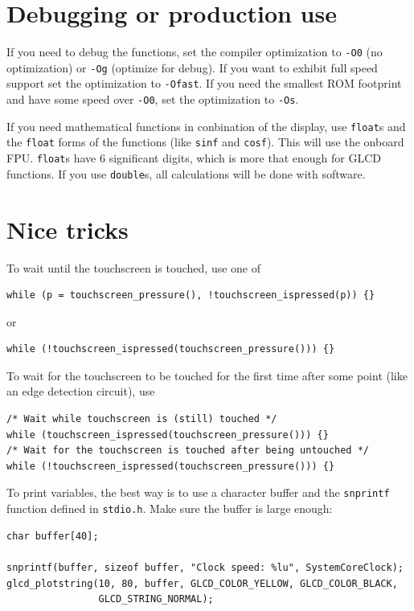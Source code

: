 \documentclass[12pt]{article}
\makeatletter
\newcommand{\ifunc}[1]{\index{#1@\texttt{#1}}}
\makeatother
\begin{document}
\section{Debugging or production use}
If you need to debug the functions, set the compiler optimization to \lstinline|-O0| (no optimization) or \lstinline|-Og| (optimize for debug). If you want to exhibit full speed support set the optimization to \lstinline|-Ofast|. If you need the smallest ROM footprint and have some speed over \lstinline|-O0|, set the optimization to \lstinline|-Os|.

If you need mathematical functions in conbination of the display, use \lstinline|float|s and the \lstinline|float| forms of the functions (like \lstinline|sinf| and \lstinline|cosf|). This will use the onboard FPU. \lstinline|float|s have 6 significant digits, which is more that enough for GLCD functions. If you use \lstinline|double|s, all calculations will be done with software.

\section{Nice tricks}
To wait until the touchscreen is touched, use one of

\begin{lstlisting}
while (p = touchscreen_pressure(), !touchscreen_ispressed(p)) {}
\end{lstlisting}

or

\begin{lstlisting}
while (!touchscreen_ispressed(touchscreen_pressure())) {}
\end{lstlisting}

To wait for the touchscreen to be touched for the first time after some point (like an edge detection circuit), use

\begin{lstlisting}
/* Wait while touchscreen is (still) touched */
while (touchscreen_ispressed(touchscreen_pressure())) {}
/* Wait for the touchscreen is touched after being untouched */
while (!touchscreen_ispressed(touchscreen_pressure())) {}
\end{lstlisting}

To print variables, the best way is to use a character buffer and the \lstinline|snprintf| \ifunc{snprintf} function defined in \lstinline|stdio.h|. Make sure the buffer is large enough:

\begin{lstlisting}
char buffer[40];

snprintf(buffer, sizeof buffer, "Clock speed: %lu", SystemCoreClock);
glcd_plotstring(10, 80, buffer, GLCD_COLOR_YELLOW, GLCD_COLOR_BLACK,
                GLCD_STRING_NORMAL);
\end{lstlisting}
\end{document}
